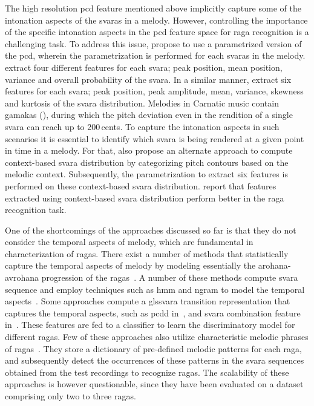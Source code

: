 The high resolution \gls{pcd} feature mentioned above implicitly capture some of the intonation aspects of the \glspl{svara} in a melody. However, controlling the importance of the  specific intonation aspects in the \gls{pcd} feature space for \gls{raga} recognition is a challenging task. To address this issue, \cite{belle2009raga,koduri2014intonation} propose to use a parametrized version of the \gls{pcd}, wherein the parametrization is performed for each \glspl{svara} in the melody. \cite{belle2009raga} extract four different features for each \gls{svara}; peak position, mean position, variance and overall probability of the \gls{svara}.  In a similar manner, \cite{koduri2014intonation} extract six features for each \gls{svara}; peak position, peak amplitude, mean, variance, skewness and kurtosis of the \gls{svara} distribution. Melodies in Carnatic music contain \glspl{gamaka} (), during which the pitch deviation even in the rendition of a single \gls{svara} can reach up to 200\,cents. To capture the intonation aspects in such scenarios it is essential to identify which \gls{svara} is being rendered at a given point in time in a melody. For that, \cite{koduri2014intonation} also propose an alternate approach to compute context-based \gls{svara} distribution by categorizing pitch contours based on the melodic context. Subsequently, the parametrization to extract six features is performed on these context-based \gls{svara} distribution. \cite{koduri2014intonation} report that features extracted using context-based \gls{svara} distribution perform better in the \gls{raga} recognition task.

One of the shortcomings of the approaches discussed so far is that they do not consider the temporal aspects of melody, which are fundamental in characterization of \glspl{raga}. There exist  a number of methods that statistically capture the temporal aspects of melody by modeling essentially the \gls{arohana}-\gls{avrohana} progression of the \glspl{raga}~\citep{pandey2003tansen,chordia2007raag,Shetty2009,sridhar2009raga,dighe2013scale,kumar2014identifying}. A number of these methods compute \gls{svara} sequence and employ techniques such as \gls{hmm} and \gls{ngram} to model the temporal aspects~\citep{pandey2003tansen,dighe2013scale,kumar2014identifying}. Some approaches compute a gls{svara} transition representation that captures the temporal aspects, such as \gls{pcdd} in~\cite{chordia2007raag}, and \gls{svara} combination feature in~\cite{Shetty2009}. These features are fed to a classifier to learn the discriminatory model for different \glspl{raga}. Few of these approaches also utilize characteristic melodic phrases of \glspl{raga}~\citep{pandey2003tansen,sridhar2009raga}. They store a dictionary of pre-defined melodic patterns for each \gls{raga}, and subsequently detect the occurrences of these patterns in the \gls{svara} sequences obtained from the test recordings to recognize \glspl{raga}. The scalability of these approaches is however questionable, since they have been evaluated on a dataset comprising only two to three \glspl{raga}. 


